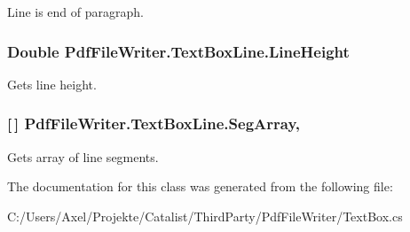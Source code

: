 Line is end of paragraph. 

\subsubsection[{\texorpdfstring{Line\+Height}{LineHeight}}]{\setlength{\rightskip}{0pt plus 5cm}Double Pdf\+File\+Writer.\+Text\+Box\+Line.\+Line\+Height\hspace{0.3cm}{\ttfamily [get]}}\hypertarget{class_pdf_file_writer_1_1_text_box_line_a6b43210707543188018991b0458e51ba}{}\label{class_pdf_file_writer_1_1_text_box_line_a6b43210707543188018991b0458e51ba}


Gets line height. 

\subsubsection[{\texorpdfstring{Seg\+Array}{SegArray}}]{ \mbox{[}$\,$\mbox{]} Pdf\+File\+Writer.\+Text\+Box\+Line.\+Seg\+Array\hspace{0.3cm}{\ttfamily [get]}, {\ttfamily [set]}}\hypertarget{class_pdf_file_writer_1_1_text_box_line_ad11eacb2339dfa2b38412b7988431967}{}\label{class_pdf_file_writer_1_1_text_box_line_ad11eacb2339dfa2b38412b7988431967}


Gets array of line segments. 



The documentation for this class was generated from the following file\+:\begin{DoxyCompactItemize}
\item 
C\+:/\+Users/\+Axel/\+Projekte/\+Catalist/\+Third\+Party/\+Pdf\+File\+Writer/Text\+Box.\+cs\end{DoxyCompactItemize}
